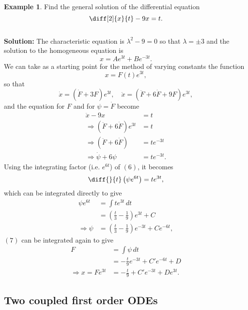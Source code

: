 \documentclass[12pt, a4paper]{article}
\newcommand{\f}[2]{\frac{#1}{#2}}
\newcommand{\imply}{\Rightarrow}
\theoremstyle{definition}
\newtheorem*{example}{Example}
\theoremstyle{plain}
\begin{document}
\begin{example}
Find the general solution of the differential equation $$\diff[2]{x}{t}-9x=t.$$ \\ \textbf{Solution:} The characteristic equation is $\lambda^2 - 9 = 0$ so that $\lambda= \pm3$ and the solution to the homogeneous equation is $$x=Ae^{3t}+Be^{-3t}.$$ We can take as a starting point for the method of varying constants the function $$x=F(t)e^{3t},$$ so that $$\dot{x}=\left(\dot{F}+3F\right)e^{3t}, \quad \ddot{x}=\left(\ddot{F}+6\dot{F}+9F\right)e^{3t},$$ and the equation for $F$ and for $\psi=\dot{F}$ become 
\begin{align}
\ddot{x}-9x&=t \nonumber\\
\imply \left(\ddot{F}+6\dot{F}\right)e^{3t}&=t \nonumber\\
\imply \left(\ddot{F}+6\dot{F}\right)&=te^{-3t} \nonumber\\
\imply \dot{\psi}+6\psi&=te^{-3t}.
\end{align} Using the integrating factor (i.e. $e^{6t}$) of $(6)$, it becomes $$\diff{}{t}\left(\psi e^{6t}\right)=te^{3t},$$ which can be integrated directly to give \begin{align}
\psi e^{6t} &= \int te^{3t} \, dt \nonumber \\
			&= \left(\f{t}{3}-\f{1}{9}\right)e^{3t}+C \nonumber \\
\imply 	\psi&= \left(\f{t}{3}-\f{1}{9}\right)e^{-3t}+Ce^{-6t},
\end{align} $(7)$ can be integrated again to give $$\begin{aligned}
F 	&=\int \psi \, dt \\
	&= -\f{t}{9}e^{-3t}+C'e^{-6t}+D \\
\imply x=Fe^{3t}&=-\f{t}{9}+C'e^{-3t}+De^{3t}.
\end{aligned}$$
\end{example}

\subsection{Two coupled first order ODEs}
\end{document}

